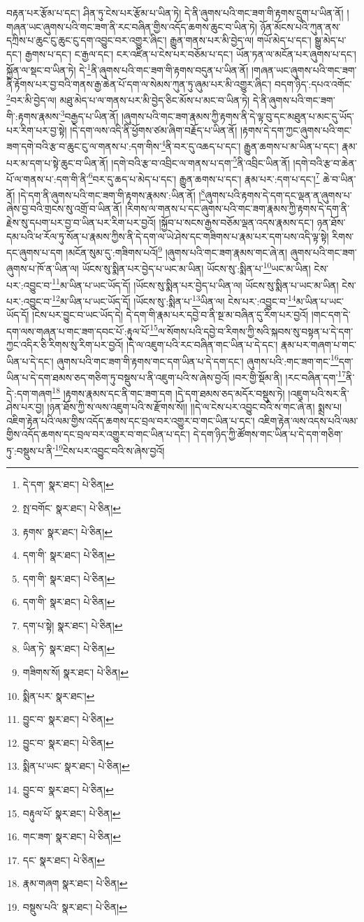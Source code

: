 བརྟན་པར་རྩོམ་པ་དང་། ཤིན་ཏུ་ངེས་པར་རྩོམ་པ་ཡིན་ཏེ། དེ་ནི་ཞུགས་པའི་གང་ཟག་གི་རྟགས་དྲུག་པ་ཡིན་ནོ། །གཞན་ཡང་ཞུགས་པའི་གང་ཟག་ནི་རང་བཞིན་གྱིས་འདོད་ཆགས་ཆུང་བ་ཡིན་ཏེ། ཉོན་མོངས་པའི་ཀུན་ནས་དཀྲིས་པ་ཆུང་ངུ་ཆུང་ངུ་དག་འབྱུང་བར་འགྱུར་ཞིང་། རྒྱུན་གནས་པར་མི་བྱེད་ལ། གཡོ་མེད་པ་དང་། སྒྱུ་མེད་པ་དང་། རྒྱགས་པ་དང་། ང་རྒྱལ་དང་། ངར་འཛིན་པ་ངེས་པར་བཅོམ་པ་དང་། ཡོན་ཏན་ལ་མངོན་པར་ཞུགས་པ་དང་། སྐྱོན་ལ་སྡང་བ་ཡིན་ཏེ། དེ་\footnote{དེ་དག་  སྣར་ཐང་།  པེ་ཅིན། }ནི་ཞུགས་པའི་གང་ཟག་གི་རྟགས་བདུན་པ་ཡིན་ནོ། །གཞན་ཡང་ཞུགས་པའི་གང་ཟག་ནི་རྟོགས་པར་བྱ་བའི་གནས་རྒྱ་ཆེན་པོ་དག་ལ་སེམས་ཀུན་ཏུ་ཞུམ་པར་མི་འགྱུར་ཞིང་། བདག་ཉིད་:དཔའ་འགོང་\footnote{སྤ་བགོང་  སྣར་ཐང་།  པེ་ཅིན། }བར་མི་བྱེད་ལ། མཐུ་མེད་པ་ལ་གནས་པར་མི་བྱེད་ཅིང་མོས་པ་མང་བ་ཡིན་ཏེ། དེ་ནི་ཞུགས་པའི་གང་ཟག་གི་:རྟགས་རྣམས་\footnote{རྟགས་  སྣར་ཐང་།  པེ་ཅིན། }བརྒྱད་པ་ཡིན་ནོ། །ཞུགས་པའི་གང་ཟག་རྣམས་ཀྱི་རྟགས་ནི་དེ་ལྟ་བུ་དང་མཐུན་པ་མང་དུ་ཡོད་པར་རིག་པར་བྱ་སྟེ། །དེ་དག་ལས་འདི་ནི་ཕྱོགས་ཙམ་ཞིག་བརྗོད་པ་ཡིན་ནོ། །རྟགས་དེ་དག་ཀྱང་ཞུགས་པའི་གང་ཟག་དགེ་བའི་རྩ་བ་ཆུང་ངུ་ལ་གནས་པ་:དག་གིས་\footnote{དག་གི་  སྣར་ཐང་།  པེ་ཅིན། }ནི་བར་དུ་འཆད་པ་དང་། རྒྱུན་ཆགས་པ་མ་ཡིན་པ་དང་། རྣམ་པར་མ་དག་པ་སྟེ་ཆུང་བ་ཡིན་ནོ། །དགེ་བའི་རྩ་བ་འབྲིང་ལ་གནས་པ་དག་\footnote{དག་གི་  སྣར་ཐང་།  པེ་ཅིན། }ནི་འབྲིང་ཡིན་ནོ། །དགེ་བའི་རྩ་བ་ཆེན་པོ་ལ་གནས་པ་:དག་གི་ནི་\footnote{དག་གི་  སྣར་ཐང་།  པེ་ཅིན། }བར་དུ་ཆད་པ་མེད་པ་དང་། རྒྱུན་ཆགས་པ་དང་། རྣམ་པར་:དག་པ་དང་།\footnote{དག་པ་སྟེ།  སྣར་ཐང་།  པེ་ཅིན། } ཆེ་བ་ཡིན་ནོ། །དེ་དག་ནི་ཞུགས་པའི་གང་ཟག་གི་རྟགས་རྣམས་:ཡིན་ནོ། །\footnote{ཡིན་ཏེ་  སྣར་ཐང་།  པེ་ཅིན། }ཞུགས་པའི་རྟགས་དེ་དག་དང་ལྡན་ན་ཞུགས་པ་ཞེས་བྱ་བའི་གྲངས་སུ་འགྲོ་བ་ཡིན་ནོ། །རིགས་ལ་གནས་པ་དང་ཞུགས་པའི་གང་ཟག་རྣམས་ཀྱི་རྟགས་དེ་དག་ནི་རྗེས་སུ་དཔག་པར་བྱ་བ་ཡིན་པར་རིག་པར་བྱའོ། །སྐྱོབ་པ་སངས་རྒྱས་བཅོམ་ལྡན་འདས་རྣམས་དང་། ཉན་ཐོས་དམ་པའི་ཕ་རོལ་ཏུ་སོན་པ་རྣམས་ཀྱིས་ནི་དེ་དག་ལ་ཡེ་ཤེས་དང་གཟིགས་པ་རྣམ་པར་དག་པས་འདི་ལྟ་སྟེ། རིགས་དང་ཞུགས་པ་དག །མངོན་སུམ་དུ་:གཟིགས་པའོ།\footnote{གཟིགས་སོ།  སྣར་ཐང་།  པེ་ཅིན། } །ཞུགས་པའི་གང་ཟག་རྣམས་གང་ཞེ་ན། ཞུགས་པའི་གང་ཟག་ཞུགས་པ་ཁོ་ན་ཡིན་ལ། ཡོངས་སུ་སྨིན་པར་བྱེད་པ་ཡང་མ་ཡིན། ཡོངས་སུ་:སྨིན་པ་\footnote{སྨིན་པར་  སྣར་ཐང་། }ཡང་མ་ཡིན། ངེས་པར་:འབྱུང་བ་\footnote{བྱུང་བ་  སྣར་ཐང་།  པེ་ཅིན། }མ་ཡིན་པ་ཡང་ཡོད་དོ། །ཡོངས་སུ་སྨིན་པར་བྱེད་པ་ཡིན་ལ། ཡོངས་སུ་སྨིན་པ་ཡང་མ་ཡིན། ངེས་པར་:འབྱུང་བ་\footnote{བྱུང་བ་  སྣར་ཐང་།  པེ་ཅིན། }མ་ཡིན་པ་ཡང་ཡོད་དོ། །ཡོངས་སུ་:སྨིན་པ་\footnote{སྨིན་པ་ཡང་  སྣར་ཐང་།  པེ་ཅིན། }ཡིན་ལ། ངེས་པར་:འབྱུང་བ་\footnote{བྱུང་བ་  སྣར་ཐང་།  པེ་ཅིན། }མ་ཡིན་པ་ཡང་ཡོད་དོ། །ངེས་པར་བྱུང་བ་ཡང་ཡོད་དེ། དེ་དག་གི་རྣམ་པར་དབྱེ་བ་ནི་སྔ་མ་བཞིན་དུ་རིག་པར་བྱའོ། །གང་དག་དེ་དག་ལས་གཞན་པ་གང་ཟག་དབང་པོ་:རྟུལ་པོ་\footnote{བརྟུལ་པོ་  སྣར་ཐང་།  པེ་ཅིན། }ལ་སོགས་པའི་དབྱེ་བ་རིགས་ཀྱི་སའི་སྐབས་སུ་བསྟན་པ་དེ་དག་ཀྱང་འདིར་ཅི་རིགས་སུ་རིག་པར་བྱའོ། །དེ་ལ་འཇུག་པའི་རང་བཞིན་གང་ཡིན་པ་དེ་དང་། རྣམ་པར་གཞག་པ་གང་ཡིན་པ་དེ་དང་། ཞུགས་པའི་གང་ཟག་གི་རྟགས་གང་དག་ཡིན་པ་དེ་དག་དང་། ཞུགས་པའི་:གང་ཟག་གང་\footnote{གང་ཟག་  སྣར་ཐང་།  པེ་ཅིན། }དག་ཡིན་པ་དེ་དག་ཐམས་ཅད་གཅིག་ཏུ་བསྡུས་པ་ནི་འཇུག་པའི་ས་ཞེས་བྱའོ། །བར་གྱི་སྡོམ་ནི། །རང་བཞིན་དག་\footnote{དང་  སྣར་ཐང་།  པེ་ཅིན། }ནི་དེ་:དག་གཞག\footnote{རྣམ་གཞག  སྣར་ཐང་།  པེ་ཅིན། } །རྟགས་རྣམས་དང་ནི་གང་ཟག་དག །དེ་དག་ཐམས་ཅད་མདོར་བསྡུས་ཏེ། །འཇུག་པའི་སར་ནི་ཤེས་པར་བྱ། །ཉན་ཐོས་ཀྱི་ས་ལས་འཇུག་པའི་ས་རྫོགས་སོ།། །།དེ་ལ་ངེས་པར་འབྱུང་བའི་ས་གང་ཞེ་ན། སྨྲས་པ། འཇིག་རྟེན་པའི་ལམ་གྱིས་འདོད་ཆགས་དང་བྲལ་བར་འགྱུར་བ་གང་ཡིན་པ་དང་། འཇིག་རྟེན་ལས་འདས་པའི་ལམ་གྱིས་འདོད་ཆགས་དང་བྲལ་བར་འགྱུར་བ་གང་ཡིན་པ་དང་། དེ་དག་ཉིད་ཀྱི་ཚོགས་གང་ཡིན་པ་དེ་དག་གཅིག་ཏུ་:བསྡུས་པ་ནི་\footnote{བསྡུས་པའི་  སྣར་ཐང་།  པེ་ཅིན། }ངེས་པར་འབྱུང་བའི་ས་ཞེས་བྱའོ། 